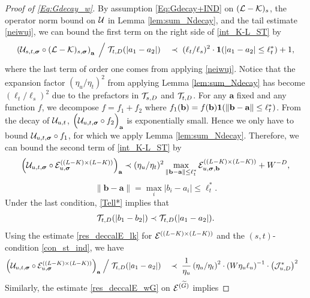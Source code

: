 \documentclass[10pt,reqno]{article}
\theoremstyle{plain} %
\theoremstyle{remark}
\numberwithin{equation}{section}
\begin{document}
\begin{proof}[Proof of \eqref{Eq:Gdecay_w}]
By  assumption \eqref{Eq:Gdecay+IND} on $({ \cal L-\cal K})_s$, the operator norm bound on $\cal U$ in Lemma \ref{lem:sum_Ndecay},  and the  tail estimate  \eqref{neiwuj}, 
we can  bound the first term on the right side  of \eqref{int_K-L_ST} by 
\begin{equation} \label{res_deccalE_0}
\left(\mathcal{U}_{s, t, \boldsymbol{\sigma}} \circ (\mathcal{L} - \mathcal{K})_{s, \boldsymbol{\sigma}}\right)_{\textbf{a}}\;\Big/\; 
  {\cal T}_{t, D}(|a_1-a_2|) \quad 
  \prec \;   (\ell_t/\ell_s)^2\cdot {\bf 1}(|a_1-a_2|\le \ell_t^*) + 1,
\end{equation}
where the last term of order one comes from applying \eqref{neiwuj}. Notice that the expansion factor $\left(\eta_u / \eta_t\right)^2$  from applying Lemma \ref{lem:sum_Ndecay} has become 
$ (\ell_t/\ell_s)^2$ due to the prefactors in $ {\cal T}_{s, D}$ and  ${\cal T}_{t, D}$.
For  any $\textbf{a}$ fixed and any function $f$,  we decompose $f  = f_1  + f_2   $ where 
$f_1 (\textbf{b}) = f (\textbf{b}) {\bf 1} ( \| \textbf{b}-\textbf{a}\|\le \ell_t^*) $. 
From the decay of ${\cal U}_{u,t}$,  $\Big ( {\cal U}_{u,t, \boldsymbol{\sigma}} \circ f_2 \Big)_\textbf{a}$ is exponentially small.  
Hence we only have to bound $  {\cal U}_{u,t, \boldsymbol{\sigma}} \circ f_1$, for which we apply  Lemma \ref{lem:sum_Ndecay}. Therefore,  
we can bound the second  term of \eqref{int_K-L_ST} by 
$$
 \Big({\cal U}_{u,t, \boldsymbol{\sigma}}\circ  {\cal E}^{( (L-K)\times(L-K) )}_{u, \boldsymbol{\sigma}}\Big)_\textbf{a}
 \prec (\eta_u/\eta_t)^2 \max_{\| \textbf{b}-\textbf{a}\|\le \ell_t^*}{\cal E}^{( (L-K)\times(L-K) )}_{u, \boldsymbol{\sigma}, \textbf{b}}+W^{-D}, 
$$
$$
 \|\textbf{b}-\textbf{a}\|=\max_i |b_i-a_i|\le \ell_t^*.
 $$
Under the last  condition, \eqref{Tell*} implies that 
$$
 {\cal T}_{t, D}(|b_1-b_2|)\prec  {\cal T}_{t, D}(|a_1-a_2|).
$$
Using the estimate \eqref{res_deccalE_lk} for ${\cal E}^{((L-K)\times(L-K))}$ and the $(s,t)$-condition \eqref{con_st_ind}, we have 
\begin{align} 
\label{res_deccalE_1}
     \Big({\cal U}_{u,t, \boldsymbol{\sigma}}\circ  {\cal E}^{( (L-K)\times(L-K) )}_{u, \boldsymbol{\sigma}}\Big)_\textbf{a}\;\Big/\; 
 {\cal T}_{t, D}(|a_1-a_2|) \quad 
  & \prec \; 
  \frac{1}{\eta_u}\left(\eta_u / \eta_t\right)^2 
   \cdot  
   \left(W\eta_u\ell_u\right)^{-1 }
    \cdot 
\left({\cal J}^*_{u,D}\right)^2
\end{align} 
Similarly,   the estimate \eqref{res_deccalE_wG} on ${\cal E}^{(\widetilde{G} )}$ implies   

\end{proof}
\end{document}
